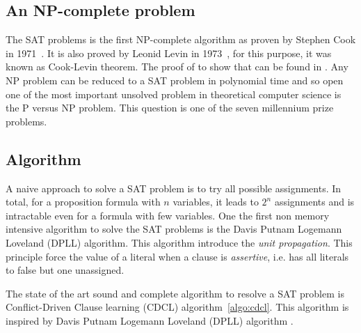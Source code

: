 \subsection{An NP-complete problem}


The SAT problems is the first NP-complete algorithm as proven by Stephen Cook in 1971~\cite{cook1971complexity}.
It is also proved by Leonid Levin in 1973~\cite{4640789}, for this purpose, it was known as Cook-Levin theorem.
The proof of to show that can be found in \cite{sipser2006introduction}.
Any NP problem can be reduced to a SAT problem in polynomial time and so open one of the most important 
unsolved problem in theoretical computer science is the P versus NP problem.
This question is one of the seven millennium prize problems.


%
%


\subsection{Algorithm}

A naive approach to solve a SAT problem is to try all possible assignments. In total,
for a proposition formula with $n$ variables, it leads to $2^n$ assignments and is intractable
even for a formula with few variables.
One the first non memory intensive algorithm to solve the SAT problems is 
the Davis Putnam Logemann Loveland (DPLL) algorithm. This algorithm introduce the \emph{unit propagation}.
This principle force the value of a literal when a clause is \emph{assertive}, i.e. 
has all literals to false but one unassigned.


The state of the art sound and complete algorithm to resolve a SAT problem is 
Conflict-Driven Clause learning (CDCL) algorithm~\ref{algo:cdcl}.
This algorithm is inspired by Davis Putnam Logemann Loveland (DPLL) algorithm \cite{dpll_62}.


